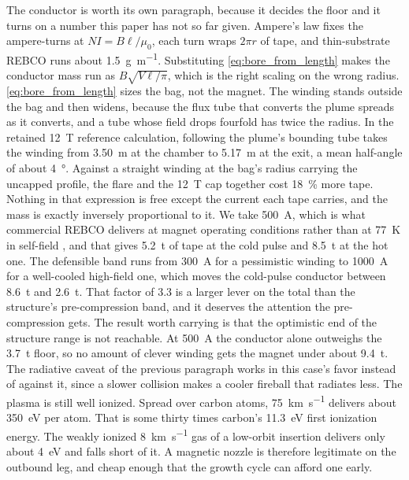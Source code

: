 \documentclass{article}
\begin{document}
The conductor is worth its own paragraph, because it decides the floor and it turns on a number this paper has not so far given. Ampere's law fixes the ampere-turns at $NI = B\ell/\mu_0$, each turn wraps $2\pi r$ of tape, and thin-substrate REBCO runs about \SI{1.5}{\gram\per\meter}. Substituting \autoref{eq:bore_from_length} makes the conductor mass run as $B\sqrt{V\ell/\pi}$, which is the right scaling on the wrong radius. \autoref{eq:bore_from_length} sizes the bag, not the magnet. The winding stands outside the bag and then widens, because the flux tube that converts the plume spreads as it converts, and a tube whose field drops fourfold has twice the radius. In the retained \SI{12}{\tesla} reference calculation, following the plume's bounding tube takes the winding from \SI{3.50}{\meter} at the chamber to \SI{5.17}{\meter} at the exit, a mean half-angle of about \SI{4}{\degree}. Against a straight winding at the bag's radius carrying the uncapped profile, the flare and the \SI{12}{\tesla} cap together cost \SI{18}{\percent} more tape. Nothing in that expression is free except the current each tape carries, and the mass is exactly inversely proportional to it. We take \SI{500}{\ampere}, which is what commercial REBCO delivers at magnet operating conditions rather than at \SI{77}{\kelvin} in self-field \cite{rebco_tapes}, and that gives \SI{5.2}{\tonne} of tape at the cold pulse and \SI{8.5}{\tonne} at the hot one. The defensible band runs from \SI{300}{\ampere} for a pessimistic winding to \SI{1000}{\ampere} for a well-cooled high-field one, which moves the cold-pulse conductor between \SI{8.6}{\tonne} and \SI{2.6}{\tonne}. That factor of 3.3 is a larger lever on the total than the structure's pre-compression band, and it deserves the attention the pre-compression gets. The result worth carrying is that the optimistic end of the structure range is not reachable. At \SI{500}{\ampere} the conductor alone outweighs the \SI{3.7}{\tonne} floor, so no amount of clever winding gets the magnet under about \SI{9.4}{\tonne}. The radiative caveat of the previous paragraph works in this case's favor instead of against it, since a slower collision makes a cooler fireball that radiates less. The plasma is still well ionized. Spread over carbon atoms, \SI{75}{\kilo\meter\per\second} delivers about \SI{350}{\electronvolt} per atom. That is some thirty times carbon's \SI{11.3}{\electronvolt} first ionization energy. The weakly ionized \SI{8}{\kilo\meter\per\second} gas of a low-orbit insertion delivers only about \SI{4}{\electronvolt} and falls short of it. A magnetic nozzle is therefore legitimate on the outbound leg, and cheap enough that the growth cycle can afford one early.
\end{document}
